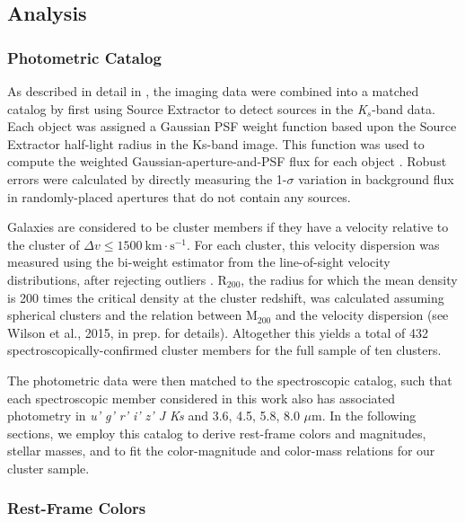 \subsection{Analysis}\label{analysis}

\subsubsection{Photometric Catalog}\label{sec-catalog}

As described in detail in \citet{van-der-Burg:2013zn}, the imaging data were combined into a matched catalog by first using Source Extractor to detect sources in the \textit{K$_s$}-band data. Each object was assigned a Gaussian PSF weight function based upon the Source Extractor half-light radius in the Ks-band image. This function was used to compute the weighted Gaussian-aperture-and-PSF flux for each object \citep{Kuijken:2008vf}. Robust errors were calculated by directly measuring the 1-$\sigma$ variation in background flux in randomly-placed apertures that do not contain any sources.

Galaxies are considered to be cluster members if they have a velocity relative to the cluster of $\Delta v \le 1500~\mathrm{km\cdot s^{-1}}$. For each cluster, this velocity dispersion was measured using the bi-weight estimator \citep{Beers:1990bf}
from the line-of-sight velocity distributions, after rejecting outliers \citep{Girardi:1993ud,Fadda:1996kk}. R$_{200}$, the radius for which the mean density is 200 times the critical density at the cluster redshift, was calculated assuming spherical clusters and the \citet{Evrard:2008lr} relation between $\mathrm{M}_{200}$ and the velocity dispersion (see Wilson et al., 2015, in prep. for details). Altogether this yields a total of 432 spectroscopically-confirmed cluster members for the full sample of ten clusters.


The photometric data were then matched to the spectroscopic catalog, such that each spectroscopic member considered in this work also has associated photometry in \textit{u' g' r' i' z' J Ks } and 3.6, 4.5, 5.8, 8.0 $\mu$m. In the following sections, we employ this catalog to derive rest-frame colors and magnitudes, stellar masses, and to fit the color-magnitude and color-mass relations for our cluster sample.

\subsubsection{Rest-Frame Colors}\label{sec-rest_frame_color}

